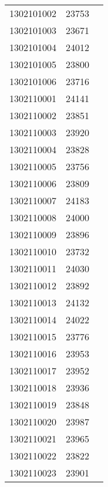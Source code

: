\begin{longtable}[h]{lcc}
		1302101002 & 23753\\
		1302101003 & 23671\\
		1302101004 & 24012\\
		1302101005 & 23800\\
		1302101006 & 23716\\
		1302110001 & 24141\\
		1302110002 & 23851\\
		1302110003 & 23920\\
		1302110004 & 23828\\
		1302110005 & 23756\\
		1302110006 & 23809\\
		1302110007 & 24183\\
		1302110008 & 24000\\
		1302110009 & 23896\\
		1302110010 & 23732\\
		1302110011 & 24030\\
		1302110012 & 23892\\
		1302110013 & 24132\\
		1302110014 & 24022\\
		1302110015 & 23776\\
		1302110016 & 23953\\
		1302110017 & 23952\\
		1302110018 & 23936\\
		1302110019 & 23848\\
		1302110020 & 23987\\
		1302110021 & 23965\\
		1302110022 & 23822\\
		1302110023 & 23901\\
\end{longtable}